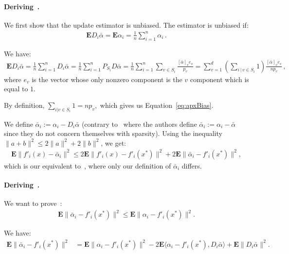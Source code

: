 \documentclass[twoside]{article}
\newcommand{\Econd}{\mathbf{E}}
\begin{document}
\paragraph{Deriving~\citet[Equation (6)]{qsaga}.}
We first show that the update estimator is unbiased.
The estimator is unbiased if:
\begin{align}\label{eq:apxBias}
\Econd D_i \bar \alpha = \Econd \alpha_i = \frac{1}{n}\sum_{i=1}^n \alpha_i \, .
\end{align}

We have:
\begin{align*}
\Econd D_i \bar \alpha 
= \frac{1}{n} \sum_{i=1}^n D_i \bar \alpha
= \frac{1}{n} \sum_{i=1}^n P_{S_i} D \bar \alpha
= \frac{1}{n} \sum_{i=1}^n \sum_{v \in S_i} \frac{[\bar \alpha]_v e_v}{p_v}
= \sum_{v=1}^{d} \left( \sum_{i\, | \, v \in S_i} 1 \right) \frac{[\bar \alpha]_v e_v}{n p_v}  \, ,
\end{align*}
where $e_v$ is the vector whose only nonzero component is the $v$ component which is equal to $1$.

By definition, $\sum_{i|v \in S_i} 1 = n p_v,$ which gives us Equation~\eqref{eq:apxBias}.

We define $\bar \alpha_i := \alpha_i - D_i\bar \alpha$ (contrary to~\citet{qsaga} where the authors define $\bar \alpha_i := \alpha_i - \bar \alpha$ since they do not concern themselves with sparsity).
Using the inequality $\|a+b\|^2 \leq 2 \|a\|^2 + 2 \|b\|^2$, we get:
\begin{align}
\Econd \|f'_i(x) - \bar \alpha_i\|^2 
\leq 2\Econd \|f'_i(x) -f'_i(x^*)\|^2 + 2\Econd \|\bar\alpha_i -f'_i(x^*)\|^2,
\end{align}
which is our equivalent to~\citet[Eq.(6)]{qsaga}, where only our definition of $\bar \alpha_i$ differs.

\paragraph{Deriving~\citet[Equation (9)]{qsaga}.}
We want to prove~\citet[Eq.(9)]{qsaga}:
\begin{align}
\Econd \|\bar \alpha_i -f'_i(x^*)\|^2
\leq \Econd \|\alpha_i -f'_i(x^*)\|^2 .
\end{align}

We have:
\begin{align} \label{eq:alphaiBarVariance}
\Econd \|\bar \alpha_i -f'_i(x^*)\|^2
&= \Econd \|\alpha_i -f'_i(x^*)\|^2
	-2\Econd \langle \alpha_i - f'_i(x^*), D_i \bar \alpha \rangle + \Econd\|D_i\bar \alpha\|^2 .
\end{align}
\end{document}

